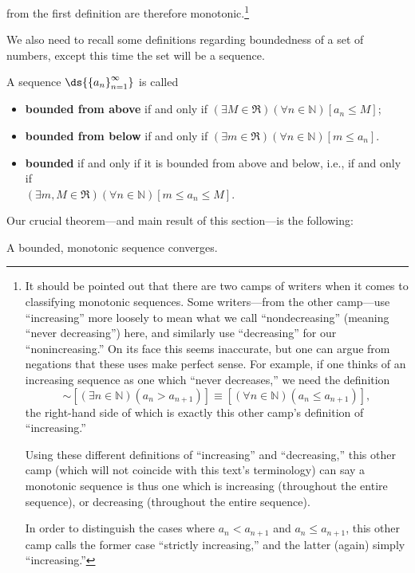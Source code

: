 from the first definition are therefore monotonic.\footnote{%
It should be pointed out that there are two camps of writers
when it comes to classifying monotonic sequences.
Some writers---from the other camp---use ``increasing'' more loosely to mean
what we call ``nondecreasing'' (meaning
``never decreasing'') here, and similarly use
``decreasing'' for our ``nonincreasing.''  On its face this
seems inaccurate, but one can argue from negations that
these uses make perfect sense.  For example, if one
thinks of an increasing sequence as one which 
``never decreases,'' we need the definition
$$\sim\left[(\exists n\in\mathbb{N})\left(a_n>a_{n+1}\right)\right]
\equiv\left[(\forall n\in\mathbb{N})\left(a_n\le a_{n+1}\right)\right],$$
the right-hand side of which is exactly this other camp's definition
of ``increasing.''

Using these different definitions of ``increasing'' and ``decreasing,''
this other camp (which will not coincide with this text's
terminology) can say a monotonic sequence is thus one which
is increasing (throughout the entire sequence), or decreasing
(throughout the entire sequence).

In order to distinguish the cases where $a_n<a_{n+1}$ and
$a_n\le a_{n+1}$, this other camp calls the former case
``strictly increasing,'' and the latter (again) simply ``increasing.''
}

We also need to recall some definitions regarding boundedness of
a set of numbers, except this time the set will be a sequence.

\begin{definition}
A sequence $\ds{\left\{a_n\right\}_{n=1}^\infty}$ is called
\begin{itemize}
\item {\bf bounded from above} if and only if 
      $(\exists M\in\Re)(\forall n\in\mathbb{N})
        \left[a_n\le M\right]$;
\item {\bf bounded from below} if and only if
      $(\exists m\in\Re)(\forall n\in\mathbb{N})
         \left[m\le a_n\right]$.
\item {\bf bounded} if and only if it is bounded from above and
       below, i.e., if and only if\\
       $(\exists m,M\in\Re)(\forall n\in\mathbb{N})
        \left[m\le a_n\le M\right]$.
\end{itemize}
\end{definition}

Our crucial theorem---and main result of this section---is the
following:
\begin{theorem}
A bounded, monotonic sequence converges.
\end{theorem}

